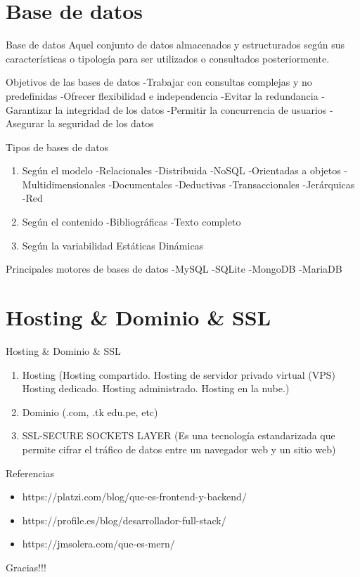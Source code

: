 \documentclass[11pt]{beamer}
\begin{document}
\section{Base de datos}
\begin{frame}{Base de datos}
	Aquel conjunto de datos almacenados y estructurados según sus características o tipología para ser utilizados o consultados posteriormente.
	
	
	\begin{alertblock}{Objetivos de las bases de datos}
		-Trabajar con consultas complejas y no predefinidas
		-Ofrecer flexibilidad e independencia
		-Evitar la redundancia
		-Garantizar la integridad de los datos
		-Permitir la concurrencia de usuarios
		-Asegurar la seguridad de los datos
	\end{alertblock}
	
	
\end{frame}

\begin{frame}
	\begin{block}{Tipos de bases de datos}
	\begin{enumerate}
		\item Según el modelo
		-Relacionales
		-Distribuida
		-NoSQL
		-Orientadas a objetos
		-Multidimensionales
		-Documentales
		-Deductivas
		-Transaccionales
		-Jerárquicas
		-Red
		\item 		Según el contenido
		-Bibliográficas
		-Texto completo
		\item 	Según la variabilidad
		Estáticas
		Dinámicas
	\end{enumerate}
\end{block}

	\begin{block}{Principales motores de bases de datos}
		-MySQL
		-SQLite
		-MongoDB
		-MariaDB
	\end{block}
\end{frame}
\section{Hosting \& Dominio \& SSL}
\begin{frame}{Hosting \& Dominio \& SSL}
	\begin{enumerate}
		\item Hosting (Hosting compartido.
		Hosting de servidor privado virtual (VPS)
		Hosting dedicado.
		Hosting administrado.
		Hosting en la nube.)
		\item Dominio (.com, .tk edu.pe, etc)
		\item SSL-SECURE SOCKETS LAYER (Es una tecnología estandarizada que permite cifrar el tráfico de datos entre un navegador web y un sitio web)
	\end{enumerate}
\end{frame}

\begin{frame}{Referencias}
	\begin{itemize}
		\item https://platzi.com/blog/que-es-frontend-y-backend/
		\item https://profile.es/blog/desarrollador-full-stack/
		\item https://jmsolera.com/que-es-mern/
	\end{itemize}
\end{frame}


\begin{frame}
	\huge Gracias!!!
\end{frame}
\end{document}
